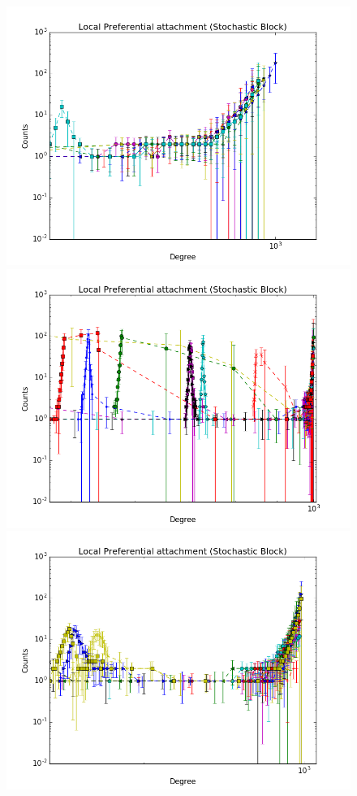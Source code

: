 \begin{figure}[ht]
	\endminipage
		\vspace{-0.29cm}
	\includegraphics[scale=0.27]{img/expe/1_ibp/figure_2}
	\endminipage
	\includegraphics[scale=0.27]{img/expe/2_ibp/figure_2} 
	\endminipage
	\includegraphics[scale=0.27]{img/expe/3_ibp/figure_2}

\end{figure}
